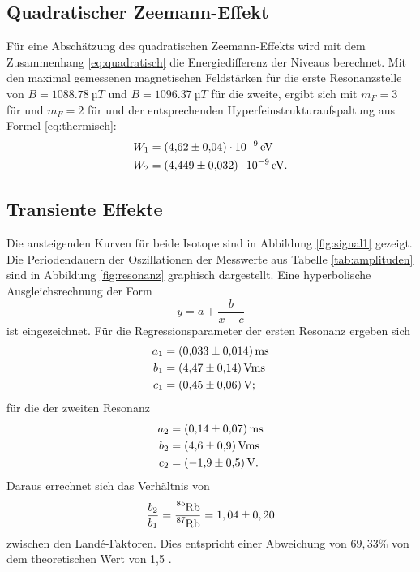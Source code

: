 \subsection{Quadratischer Zeemann-Effekt}
Für eine Abschätzung des quadratischen Zeemann-Effekts wird mit dem Zusammenhang \eqref{eq:quadratisch} die Energiedifferenz der Niveaus berechnet.
Mit den maximal gemessenen magnetischen Feldstärken für die erste Resonanzstelle von $B=\SI{1088,78}{µT}$ und $B=\SI{1096,37}{µT}$ für die zweite, ergibt sich mit $m_F=3$ für  und $m_F=2$ für  und der entsprechenden Hyperfeinstrukturaufspaltung aus Formel \eqref{eq:thermisch}:
\begin{align*}
  W_1&= \SI{4,62 \pm 0,04 e-9}{eV}\\
  W_2&= \SI{4,449 \pm 0,032 e-9}{eV}.
\end{align*}
\subsection{Transiente Effekte}
Die ansteigenden Kurven für beide Isotope sind in Abbildung \ref{fig:signal1} gezeigt. Die Periodendauern der Oszillationen der Messwerte aus Tabelle \ref{tab:amplituden} sind in Abbildung \ref{fig:resonanz} graphisch dargestellt.
Eine hyperbolische Ausgleichsrechnung der Form
\begin{equation}
  y=a+\frac{b}{x-c}
\end{equation}
ist eingezeichnet.
Für die Regressionsparameter der ersten Resonanz ergeben sich
\begin{align*}
  a_1&= \SI{0,033 \pm 0,014}{ms}\\
  b_1&= \SI{4,47 \pm 0,14}{V ms}\\
  c_1&= \SI{0,45 \pm 0,06}{V};
\end{align*}
für die der zweiten Resonanz
\begin{align*}
  a_2&= \SI{0,14 \pm 0,07}{ms}\\
  b_2&= \SI{4,6 \pm 0,9}{V ms}\\
  c_2&= \SI{-1,9 \pm 0,5}{V}.
\end{align*}
Daraus errechnet sich das Verhältnis von
\begin{equation*}
\frac{b_2}{b_1}=\frac{\ce{^{85}Rb}}{\ce{^{87}Rb}}=1,04 \pm 0,20
\end{equation*}
zwischen den Landé-Faktoren.
Dies entspricht einer Abweichung von $69,33\%$ von dem theoretischen Wert von 1,5 \cite{anleitung}.

